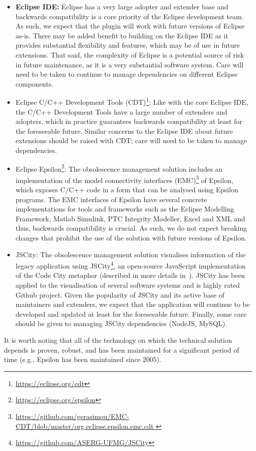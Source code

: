 \documentclass{llncs}
\begin{document}
\begin{itemize}
\item \textbf{Eclipse IDE:} Eclipse has a very large adopter and extender base and backwards compatibility is a core priority of the Eclipse development team. As such, we expect that the plugin will work with future versions of Eclipse as-is. There may be added benefit to building on the Eclipse IDE as it provides substantial flexibility and features, which may be of use in future extensions. That said, the complexity of Eclipse is a potential source of risk in future maintenance, as it is a very substantial software system. Care will need to be taken to continue to manage dependencies on different Eclipse components.

\item Eclipse C/C++ Development Tools (CDT)\footnote{\url{https://eclipse.org/cdt}}: Like with the core Eclipse IDE, the C/C++ Development Tools have a large number of extenders and adopters, which in practice guarantees backwards compatibility at least for the foreseeable future. Similar concerns to the Eclipse IDE about future extensions should be raised with CDT; care will need to be taken to manage dependencies.

\item Eclipse Epsilon\footnote{\url{https://eclipse.org/epsilon}}: The obsolescence management solution includes an implementation of the model connectivity interfaces (EMC)\footnote{\url{https://github.com/gerasimou/EMC-CDT/blob/master/org.eclipse.epsilon.emc.cdt }} of Epsilon, which exposes C/C++ code in a form that can be analysed using Epsilon programs. The EMC interfaces of Epsilon have several concrete implementations for tools and frameworks such as the Eclipse Modelling Framework, Matlab Simulink, PTC Integrity Modeller, Excel and XML and thus, backwards compatibility is crucial. As such, we do not expect breaking changes that prohibit the use of the solution with future versions of Epsilon.

\item JSCity: The obsolescence management solution visualises 
information of the legacy application using 
JSCity\footnote{\url{https://github.com/ASERG-UFMG/JSCity}}, an open-source 
JavaScript implementation of the Code City metaphor (described in more details 
in~\cite{gerasimou17}). JSCity has been applied to the visualisation of 
several software systems and is highly rated Github project. 
Given the popularity of JSCity and its active base of maintainers and 
extenders, we expect that the application will continue to be developed and 
updated at least for the foreseeable future. Finally, some care should be given 
to managing JSCity dependencies (NodeJS, MySQL).


\end{itemize}
It is worth noting that all of the technology on which the technical solution depends is proven, robust, and has been maintained for a significant period of time (e.g., Epsilon has been maintained since 2005).
 
\end{document}
